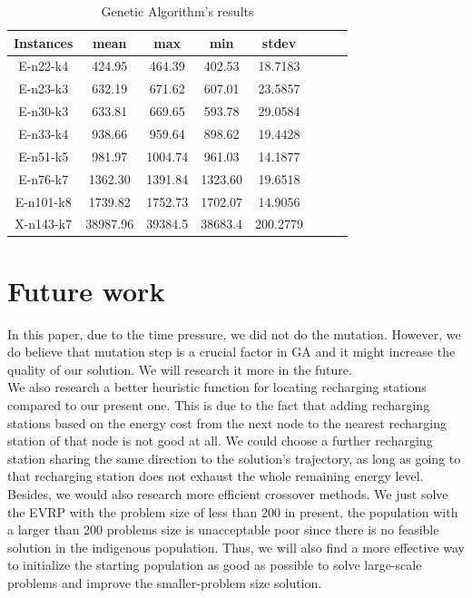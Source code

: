 \documentclass[conference,compsoc]{IEEEtran}
\begin{document}
\begin{table}[h!]
    \centering
        \begin{tabular}{|c|c|c|c|c|c|c|c|}
    \hline
         Instances & mean & max & min & stdev  \\
         \hline 
         E-n22-k4&	424.95&	464.39&	402.53&	18.7183\\
         \hline
E-n23-k3	&632.19&	671.62&	607.01&	23.5857\\
\hline
E-n30-k3	&633.81	&669.65&	593.78&	29.0584\\
\hline
E-n33-k4&	938.66&	959.64	&898.62&	19.4428\\
\hline
E-n51-k5&	981.97&	1004.74&	961.03&	14.1877\\
\hline
E-n76-k7&	1362.30&	1391.84&	1323.60&	19.6518\\
\hline
E-n101-k8&	1739.82&	1752.73&	1702.07&	14.9056\\
\hline
X-n143-k7 &	38987.96 &	39384.5 &	38683.4	 & 200.2779\\\hline
    \end{tabular}
    \caption{Genetic Algorithm's results}
    \label{tab:my_label}
\end{table}
\section{Future work}
In this paper, due to the time pressure, we did not do the mutation. However, we do believe that mutation step is a crucial factor in GA and it might increase the quality of our solution. We will research it more in the future.\\

We also research a better heuristic function for locating recharging stations compared to our present one. This is due to the fact that adding recharging stations based on the energy cost from the next node to the nearest recharging station of that node is not good at all. We could choose a further recharging station sharing the same direction to the solution's trajectory, as long as going to that recharging station does not exhaust the whole remaining energy level.\\

Besides, we would also research more efficient crossover methods. We just solve the EVRP with the problem size of less than 200 in present, the population with a larger than 200 problems size is unacceptable poor since there is no feasible solution in the indigenous population. Thus, we will also find a more effective way to initialize the starting population as good as possible to solve large-scale problems and improve the smaller-problem size solution.
\end{document}
